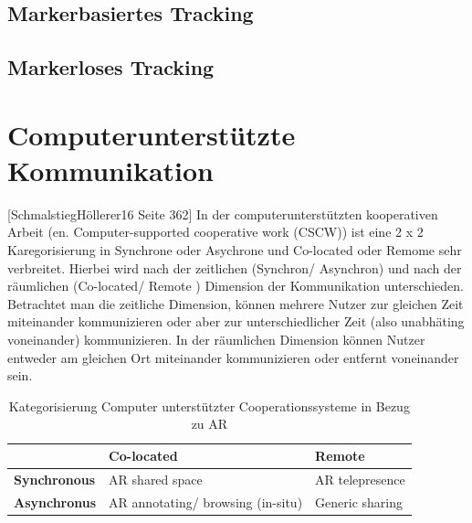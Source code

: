 
\subsection{Markerbasiertes Tracking}



\subsection{Markerloses Tracking}



\section{Computerunterstützte Kommunikation}

[SchmalstiegHöllerer16 Seite 362] In der computerunterstützten kooperativen Arbeit (en. Computer-supported cooperative work (CSCW)) ist eine 2 x 2 Karegorisierung in Synchrone oder Asychrone und Co-located oder Remome sehr verbreitet. 
Hierbei wird nach der zeitlichen (Synchron/ Asynchron) und nach der räumlichen (Co-located/ Remote ) Dimension der Kommunikation unterschieden. Betrachtet man die zeitliche Dimension, können mehrere Nutzer zur gleichen Zeit miteinander kommunizieren
oder aber zur unterschiedlicher Zeit (also unabhäting voneinander) kommunizieren. In der räumlichen Dimension können Nutzer entweder am gleichen Ort miteinander kommunizieren oder entfernt voneinander sein. 

\begin{table}[htbp]
\caption{Kategorisierung Computer unterstützter Cooperationssysteme in Bezug zu AR}
	\begin{center}
		\begin{tabular}{|l|ll|}
		\hline
		 & \textbf{Co-located} & \textbf{Remote}\\
		\hline
		\textbf{Synchronous} &  AR shared space & AR telepresence \\
		\textbf{Asynchronus} & AR annotating/ browsing (in-situ) & Generic sharing\\
		\hline
		\end{tabular}
	\end{center}
	\label{tab:categorycscw}
\end{table}

